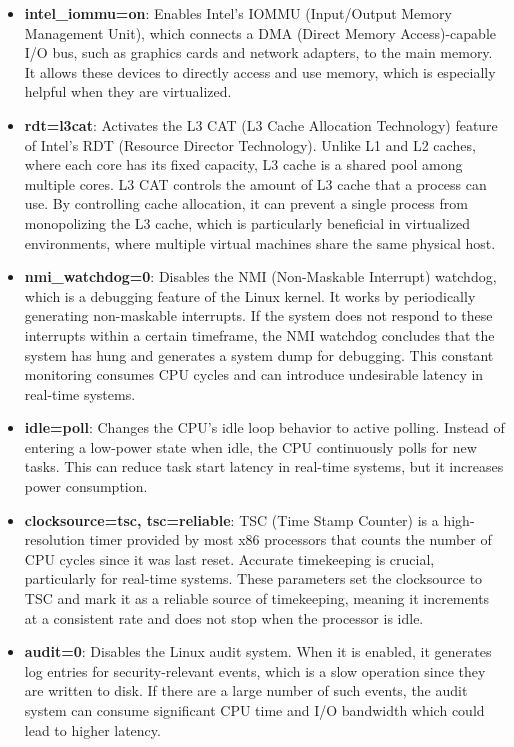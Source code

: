 \documentclass[MMR,Master,english]{twbook}
\begin{document}
\begin{itemize}
	\item \textbf{intel\_iommu=on}: Enables Intel's IOMMU (Input/Output Memory Management Unit), which connects a DMA (Direct Memory Access)-capable I/O bus, such as graphics cards and network adapters, to the main memory. It allows these devices to directly access and use memory, which is especially helpful when they are virtualized.
	\item \textbf{rdt=l3cat}: Activates the L3 CAT (L3 Cache Allocation Technology) feature of Intel’s RDT (Resource Director Technology). Unlike L1 and L2 caches, where each core has its fixed capacity, L3 cache is a shared pool among multiple cores. L3 CAT controls the amount of L3 cache that a process can use. By controlling cache allocation, it can prevent a single process from monopolizing the L3 cache, which is particularly beneficial in virtualized environments, where multiple virtual machines share the same physical host.
	\item \textbf{nmi\_watchdog=0}: Disables the NMI (Non-Maskable Interrupt) watchdog, which is a debugging feature of the Linux kernel. It works by periodically generating non-maskable interrupts. If the system does not respond to these interrupts within a certain timeframe, the NMI watchdog concludes that the system has hung and generates a system dump for debugging.  This constant monitoring consumes CPU cycles and can introduce undesirable latency in real-time systems.
	\item \textbf{idle=poll}: Changes the CPU’s idle loop behavior to active polling. Instead of entering a low-power state when idle, the CPU continuously polls for new tasks. This can reduce task start latency in real-time systems, but it increases power consumption.
	\item \textbf{clocksource=tsc, tsc=reliable}: TSC (Time Stamp Counter) is a high-resolution timer provided by most x86 processors that counts the number of CPU cycles since it was last reset. Accurate timekeeping is crucial, particularly for real-time systems. These parameters set the clocksource to TSC and mark it as a reliable source of timekeeping, meaning it increments at a consistent rate and does not stop when the processor is idle.
	\item \textbf{audit=0}: Disables the Linux audit system. When it is enabled, it generates log entries for security-relevant events, which is a slow operation since they are written to disk. If there are a large number of such events, the audit system can consume significant CPU time and I/O bandwidth which could lead to higher latency.

\end{itemize}
\end{document}
